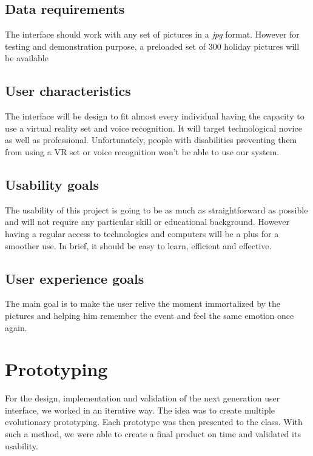 \documentclass[11pt,a4paper]{article}
\begin{document}
\subsection{Data requirements}

The interface should work with any set of pictures in a \textit{jpg} format. However for testing and demonstration purpose, a preloaded set of 300 holiday pictures will be available

\subsection{User characteristics}

The interface will be design to fit almost every individual having the capacity to use a virtual reality set and voice recognition. It will target technological novice as well as professional. Unfortunately, people with disabilities preventing them from using a VR set or voice recognition won't be able to use our system.

\subsection{Usability goals}

The usability of this project is going to be as much as straightforward as possible and will not require any particular skill or educational background. However having a regular access to technologies and computers will be a plus for a smoother use. In brief, it should be easy to learn, efficient and effective.

\subsection{User experience goals}

The main goal is to make the user relive the moment immortalized by the pictures and helping him remember the event and feel the same emotion once again. %

\section{Prototyping}

For the design, implementation and validation of the next generation user interface, we worked in an iterative way.
The idea was to create multiple evolutionary prototyping. Each prototype was then presented to the class. With such a method, we were able to create a final product on time and validated its usability.
\end{document}
